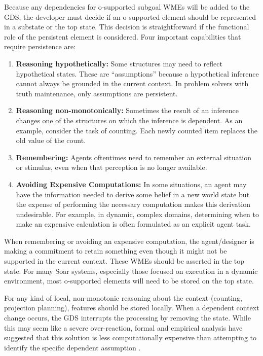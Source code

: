 Because any dependencies for o-supported subgoal WMEs will be added to the GDS, the developer must decide if an o-supported element should be represented in a substate or the top state.
This decision is straightforward if the functional role of the persistent element is considered. Four important capabilities that require persistence are:

\vspace{-8pt}
\begin{enumerate}
	\item \textbf{Reasoning hypothetically:}
		Some structures may need to	reflect hypothetical states. These are ``assumptions'' because a hypothetical inference cannot always be grounded in the current context. In problem solvers with truth maintenance, only assumptions are persistent.
	\vspace{-8pt}
	\item \textbf{Reasoning non-monotonically:}
		Sometimes the result of an inference changes one of the structures on which the inference is dependent. As an example, consider the task of counting. Each newly counted item replaces the old value of the count.
	\vspace{-8pt}
	\item \textbf{Remembering:}
		Agents oftentimes need to remember an external situation or stimulus, even when that perception is no longer available.
	\vspace{-8pt}
	\item \textbf{Avoiding Expensive Computations:}
		In some situations, an agent may have the information needed to derive some belief in a new world state but the expense of performing the necessary computation makes this derivation undesirable. For example, in dynamic, complex domains, determining when to make an expensive calculation is often formulated as an explicit agent task\cite{Jones99:Automated}.
\end{enumerate}

When remembering or avoiding an expensive computation, the agent/designer is making a commitment to retain something even though it might not be supported in the current context. These WMEs should be asserted in the top state. For many Soar systems, especially those focused on execution in a dynamic environment, most o-supported elements will need to be stored on the top state.

For any kind of local, non-monotonic reasoning about the context (counting, projection planning), features should be stored locally. When a dependent context change occurs, the GDS interrupts the processing by removing the state. While this may seem like a severe over-reaction, formal and empirical analysis have suggested that this solution is less computationally expensive than attempting to identify the specific dependent assumption \cite{Wray03:Ensuring}.


